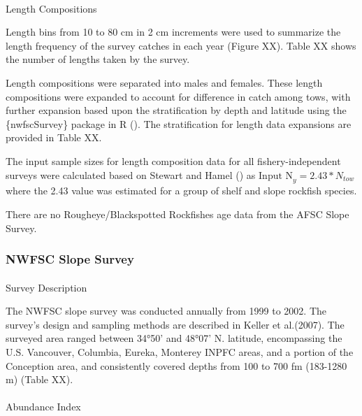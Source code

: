 \documentclass[
]{scrartcl}
\makeatletter
\let\oldparagraph\paragraph
\renewcommand{\paragraph}{
    \@ifstar
      \xxxParagraphStar
      \xxxParagraphNoStar
  }
\newcommand{\xxxParagraphStar}[1]{\oldparagraph*{#1}\mbox{}}
\newcommand{\xxxParagraphNoStar}[1]{\oldparagraph{#1}\mbox{}}
\makeatother
\begin{document}
\paragraph{Length Compositions}\label{length-compositions-1}

Length bins from 10 to 80 cm in 2 cm increments were used to summarize
the length frequency of the survey catches in each year (Figure XX).
Table XX shows the number of lengths taken by the survey.

Length compositions were separated into males and females. These length
compositions were expanded to account for difference in catch among
tows, with further expansion based upon the stratification by depth and
latitude using the \{nwfscSurvey\} package in R
().
The stratification for length data expansions are provided in Table XX.

The input sample sizes for length composition data for all
fishery-independent surveys were calculated based on Stewart and Hamel
() as
\(\text{Input N}_{y} = 2.43*N_{tow}\) where the 2.43 value was estimated
for a group of shelf and slope rockfish species.

There are no Rougheye/Blackspotted Rockfishes age data from the AFSC
Slope Survey.

\subsubsection{NWFSC Slope Survey}\label{nwfsc-slope-survey}

\paragraph{Survey Description}\label{survey-description-2}

The NWFSC slope survey was conducted annually from 1999 to 2002. The
survey's design and sampling methods are described in Keller et
al.(2007). The surveyed area ranged between 34°50' and 48°07' N.
latitude, encompassing the U.S. Vancouver, Columbia, Eureka, Monterey
INPFC areas, and a portion of the Conception area, and consistently
covered depths from 100 to 700 fm (183-1280 m) (Table XX).

\paragraph{Abundance Index}\label{abundance-index-2}
\end{document}
